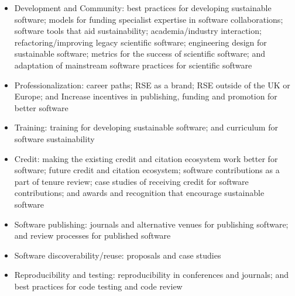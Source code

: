 \documentclass[11pt, oneside]{amsart}
\newcommand{\todo}[1]{{\color{blue}$\blacksquare$~\textsf{[TODO: #1]}}}
\begin{document}
\begin{itemize}
\renewcommand{\labelenumi}{\textbf{\theenumi}.}
\setlength{\rightmargin}{1em}

\item Development and Community:
best practices for developing sustainable software;
models for funding specialist expertise in software collaborations;
software tools that aid sustainability;
academia/industry interaction;
refactoring/improving legacy scientific software;
engineering design for sustainable software;
metrics for the success of scientific software; and
adaptation of mainstream software practices for scientific software

\item Professionalization:
career paths;
RSE as a brand;
RSE outside of the UK or Europe; and
Increase incentives in publishing, funding and promotion for better software

\item Training:
training for developing sustainable software; and 
curriculum for software sustainability

\item Credit:
making the existing credit and citation ecosystem work better for software;
future credit and citation ecosystem;
software contributions as a part of tenure review;
case studies of receiving credit for software contributions; and
awards and recognition that encourage sustainable software

\item Software publishing:
journals and alternative venues for publishing software; and
review processes for published software

\item Software discoverability/reuse:
proposals and case studies

\item Reproducibility and testing:
reproducibility in conferences and journals; and
best practices for code testing and code review

\end{itemize}

\end{document}
